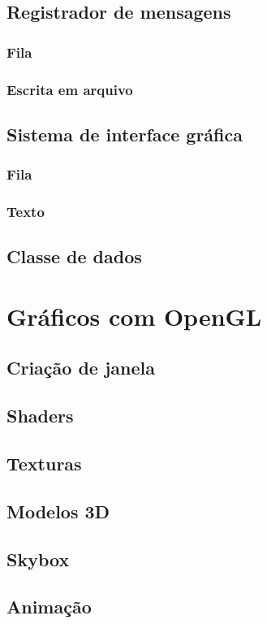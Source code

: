 \subsection{Registrador de mensagens}
\subsubsection{Fila}
\subsubsection{Escrita em arquivo}

\subsection{Sistema de interface gráfica}
\subsubsection{Fila}
\subsubsection{Texto}

\subsection{Classe de dados}

\section{Gráficos com OpenGL}
\subsection{Criação de janela}
\subsection{Shaders}
\subsection{Texturas}
\subsection{Modelos 3D}
\subsection{Skybox}
\subsection{Animação}


